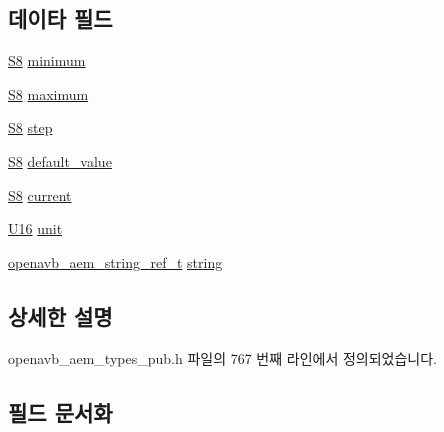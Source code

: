 \subsection*{데이타 필드}
\begin{DoxyCompactItemize}
\item 
\hyperlink{openavb__types__base__pub_8h_af1475a0bb1962ef08dd1f78bd5dba87a}{S8} \hyperlink{structopenavb__aem__control__value__format__control__linear__int8__t_a4a9da70e67de3e475f50f359ddbd82ef}{minimum}
\item 
\hyperlink{openavb__types__base__pub_8h_af1475a0bb1962ef08dd1f78bd5dba87a}{S8} \hyperlink{structopenavb__aem__control__value__format__control__linear__int8__t_a01c5a4180e2370d87199974dc755c186}{maximum}
\item 
\hyperlink{openavb__types__base__pub_8h_af1475a0bb1962ef08dd1f78bd5dba87a}{S8} \hyperlink{structopenavb__aem__control__value__format__control__linear__int8__t_a51b24a09a86fddc4b63f087539951c75}{step}
\item 
\hyperlink{openavb__types__base__pub_8h_af1475a0bb1962ef08dd1f78bd5dba87a}{S8} \hyperlink{structopenavb__aem__control__value__format__control__linear__int8__t_ac2990b21bab3ad125cdc6ca400970072}{default\+\_\+value}
\item 
\hyperlink{openavb__types__base__pub_8h_af1475a0bb1962ef08dd1f78bd5dba87a}{S8} \hyperlink{structopenavb__aem__control__value__format__control__linear__int8__t_afad15a2d16801b55372697ff54b32873}{current}
\item 
\hyperlink{openavb__types__base__pub_8h_a0a0a322d5fa4a546d293a77ba8b4a71f}{U16} \hyperlink{structopenavb__aem__control__value__format__control__linear__int8__t_a0b3ff376c10369016824076deacc055e}{unit}
\item 
\hyperlink{structopenavb__aem__string__ref__t}{openavb\+\_\+aem\+\_\+string\+\_\+ref\+\_\+t} \hyperlink{structopenavb__aem__control__value__format__control__linear__int8__t_a1f81001cefa769cb3651172fd5ab0748}{string}
\end{DoxyCompactItemize}


\subsection{상세한 설명}


openavb\+\_\+aem\+\_\+types\+\_\+pub.\+h 파일의 767 번째 라인에서 정의되었습니다.



\subsection{필드 문서화}
